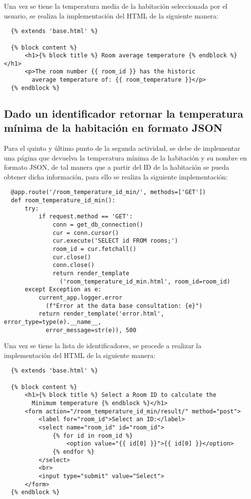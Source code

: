 \documentclass[11pt]{report}
\begin{document}
Una vez se tiene la temperatura media de la habitación seleccionada por el usuario, se realiza la implementación del HTML de la siguiente manera:

\begin{verbatim}
  {% extends 'base.html' %}

  {% block content %}
      <h1>{% block title %} Room average temperature {% endblock %}</h1>
      <p>The room number {{ room_id }} has the historic 
        average temperature of: {{ room_temperature }}</p>
  {% endblock %}
\end{verbatim}

\subsection{Dado un identificador retornar la temperatura mínima de la habitación en formato JSON}

Para el quinto y último punto de la segunda actividad, se debe de implementar una página que devuelva la temperatura mínima de la habitación y su nombre en formato JSON, de tal manera que a partir del ID de la habitación se pueda obtener dicha información, para ello se realiza la siguiente implementación:

\begin{verbatim}
  @app.route('/room_temperature_id_min/', methods=['GET'])
  def room_temperature_id_min():
      try:
          if request.method == 'GET':
              conn = get_db_connection()
              cur = conn.cursor()
              cur.execute('SELECT id FROM rooms;')
              room_id = cur.fetchall()
              cur.close()
              conn.close()
              return render_template
                ('room_temperature_id_min.html', room_id=room_id)
      except Exception as e:
          current_app.logger.error
            (f"Error at the data base consultation: {e}")
          return render_template('error.html', error_type=type(e).__name__, 
            error_message=str(e)), 500
\end{verbatim}

Una vez se tiene la lista de identificadores, se procede a realizar la implementación del HTML de la siguiente manera:

\begin{verbatim}
  {% extends 'base.html' %}

  {% block content %}
      <h1>{% block title %} Select a Room ID to calculate the 
        Minimum temperature {% endblock %}</h1>
      <form action="/room_temperature_id_min/result/" method="post">
          <label for="room_id">Select an ID:</label>
          <select name="room_id" id="room_id">
              {% for id in room_id %}
                  <option value="{{ id[0] }}">{{ id[0] }}</option>
              {% endfor %}
          </select>
          <br>
          <input type="submit" value="Select">
      </form>
  {% endblock %}
\end{verbatim}
\end{document}

